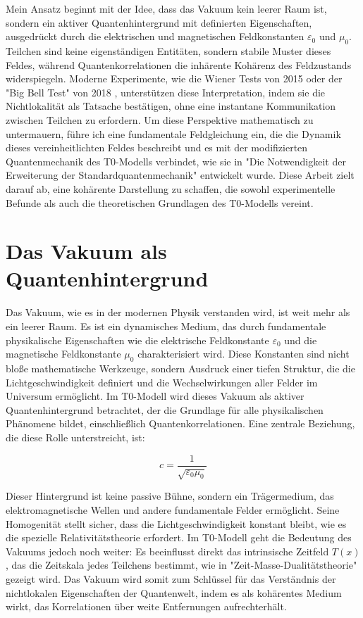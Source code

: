 \documentclass[a4paper,12pt]{article}
\newcommand{\Tfield}{T(x)}
\theoremstyle{definition}
\theoremstyle{remark}
\begin{document}
	Mein Ansatz beginnt mit der Idee, dass das Vakuum kein leerer Raum ist, sondern ein aktiver Quantenhintergrund mit definierten Eigenschaften, ausgedrückt durch die elektrischen und magnetischen Feldkonstanten \(\varepsilon_0\) und \(\mu_0\). Teilchen sind keine eigenständigen Entitäten, sondern stabile Muster dieses Feldes, während Quantenkorrelationen die inhärente Kohärenz des Feldzustands widerspiegeln. Moderne Experimente, wie die Wiener Tests von 2015 \cite{Giustina2015} oder der "Big Bell Test" von 2018 \cite{BigBellTest2018}, unterstützen diese Interpretation, indem sie die Nichtlokalität als Tatsache bestätigen, ohne eine instantane Kommunikation zwischen Teilchen zu erfordern. Um diese Perspektive mathematisch zu untermauern, führe ich eine fundamentale Feldgleichung ein, die die Dynamik dieses vereinheitlichten Feldes beschreibt und es mit der modifizierten Quantenmechanik des T0-Modells verbindet, wie sie in "Die Notwendigkeit der Erweiterung der Standardquantenmechanik" \cite{pascher_quantum_2025} entwickelt wurde. Diese Arbeit zielt darauf ab, eine kohärente Darstellung zu schaffen, die sowohl experimentelle Befunde als auch die theoretischen Grundlagen des T0-Modells vereint.
	
	\section{Das Vakuum als Quantenhintergrund}
	
	Das Vakuum, wie es in der modernen Physik verstanden wird, ist weit mehr als ein leerer Raum. Es ist ein dynamisches Medium, das durch fundamentale physikalische Eigenschaften wie die elektrische Feldkonstante \(\varepsilon_0\) und die magnetische Feldkonstante \(\mu_0\) charakterisiert wird. Diese Konstanten sind nicht bloße mathematische Werkzeuge, sondern Ausdruck einer tiefen Struktur, die die Lichtgeschwindigkeit definiert und die Wechselwirkungen aller Felder im Universum ermöglicht. Im T0-Modell wird dieses Vakuum als aktiver Quantenhintergrund betrachtet, der die Grundlage für alle physikalischen Phänomene bildet, einschließlich Quantenkorrelationen. Eine zentrale Beziehung, die diese Rolle unterstreicht, ist:
	
	\begin{equation}
		c = \frac{1}{\sqrt{\varepsilon_0 \mu_0}}
	\end{equation}
	
	Dieser Hintergrund ist keine passive Bühne, sondern ein Trägermedium, das elektromagnetische Wellen und andere fundamentale Felder ermöglicht. Seine Homogenität stellt sicher, dass die Lichtgeschwindigkeit konstant bleibt, wie es die spezielle Relativitätstheorie erfordert. Im T0-Modell geht die Bedeutung des Vakuums jedoch noch weiter: Es beeinflusst direkt das intrinsische Zeitfeld \(\Tfield\), das die Zeitskala jedes Teilchens bestimmt, wie in "Zeit-Masse-Dualitätstheorie" \cite{pascher_params_2025} gezeigt wird. Das Vakuum wird somit zum Schlüssel für das Verständnis der nichtlokalen Eigenschaften der Quantenwelt, indem es als kohärentes Medium wirkt, das Korrelationen über weite Entfernungen aufrechterhält.
	
\end{document}
